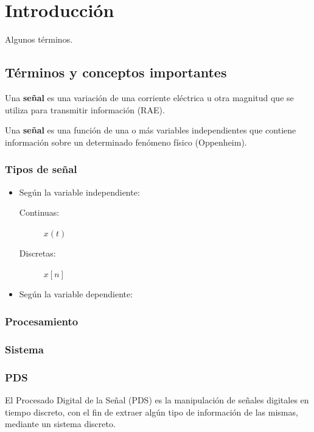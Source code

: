 \documentclass[a4paper]{book}
\begin{document}
\section{Introducción}

Algunos términos.
\subsection{Términos y conceptos importantes}
Una \textbf{señal} es una variación de una corriente eléctrica u otra magnitud que se utiliza para transmitir información (RAE).

Una \textbf{señal} es una función de una o más variables independientes que contiene información sobre un determinado fenómeno físico (Oppenheim).

\subsubsection{Tipos de señal} 
\begin{itemize}
	 \item Según la variable independiente:
	 \begin{description}
		  \item[Continuas:] $x(t)$
		  \item[Discretas:] $x[n]$
	 \end{description}
	 \item Según la variable dependiente:
\end{itemize}

\subsubsection{Procesamiento}

\subsubsection{Sistema}

\subsubsection{PDS}

El Procesado Digital de la Señal (PDS) es la manipulación de señales digitales en tiempo discreto, con el fin de extraer algún tipo de información de las mismas, mediante un sistema discreto.
\end{document}
